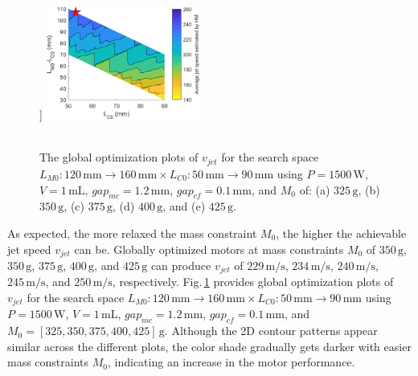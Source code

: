 \begin{figure}
            ]{
                \includegraphics[width=0.45\textwidth]{chap3/images/PMLSM_HM_400g.png}
                \label{fig:chapter/hm/optimiization/400}
            }
            \\
            \\
            \caption{
                The global optimization plots of $v_{jet}$ for the search space $L_{M0}:120\,\mathrm{mm}\rightarrow 160\,\mathrm{mm} \times L_{C0}:50\,\mathrm{mm}\rightarrow 90\,\mathrm{mm}$ using $P=1500\,\mathrm{W}$, $V=1\,\mathrm{mL}$, $gap_{mc}=1.2\,\mathrm{mm}$, $gap_{cf}=0.1\,\mathrm{mm}$,  and $M_0$ of: (a) $325\,\mathrm{g}$, (b) $350\,\mathrm{g}$, (c) $375\,\mathrm{g}$, (d) $400\,\mathrm{g}$, and (e) $425\,\mathrm{g}$.
            }   \label{fig:chapter/hm/optimization search space result for differnt mass}
        \end{figure}
            
        As expected, the more relaxed the mass constraint $M_0$, the higher the achievable jet speed $v_{jet}$ can be. Globally optimized motors at mass constraints $M_0$ of $350\,\mathrm{g}$, $350\,\mathrm{g}$, $375\,\mathrm{g}$, $400\,\mathrm{g}$, and $425\,\mathrm{g}$ can produce $v_{jet}$ of $229\,\mathrm{m/s}$, $234\,\mathrm{m/s}$, $240\,\mathrm{m/s}$, $245\,\mathrm{m/s}$, and $250\,\mathrm{m/s}$, respectively. Fig.\,\ref{fig:chapter/hm/optimization search space result for differnt mass} provides global optimization plots of $v_{jet}$ for the search space $L_{M0}:120\,\mathrm{mm}\rightarrow 160\,\mathrm{mm} \times L_{C0}:50\,\mathrm{mm}\rightarrow 90\,\mathrm{mm}$ using $P=1500\,\mathrm{W}$, $V=1\,\mathrm{mL}$, $gap_{mc}=1.2\,\mathrm{mm}$, $gap_{cf}=0.1\,\mathrm{mm}$,  and $M_0=[325,350,375,400,425]\,\mathrm{g}$. Although the 2D contour patterns appear similar across the different plots, the color shade gradually gets darker with easier mass constraints $M_0$, indicating an increase in the motor performance.
            

